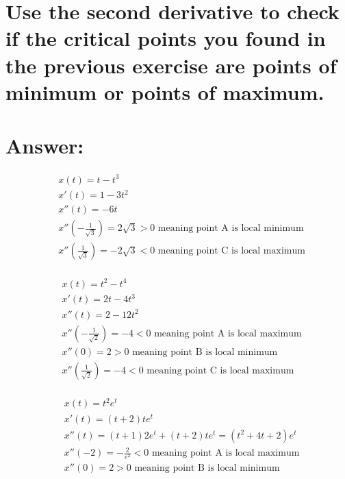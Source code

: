 \documentclass{article}
\begin{document}
\section{\normalfont Use the second derivative to check if the critical points you found in the previous exercise are points of minimum or points of maximum.}

\section*{Answer:}

\begin{equation}
\begin{split}
& x(t) = t - t^3\\
& x'(t) = 1 - 3t^2 \\
& x''(t) = -6t \\
& x''(-\frac{1}{\sqrt{3}}) = 2\sqrt{3} > 0 \text{ meaning point A is local minimum} \\ 
& x''(\frac{1}{\sqrt{3}}) = -2\sqrt{3} < 0 \text{ meaning point C is local maximum} \\
\end{split}
\end{equation}

\begin{equation}
\begin{split}
& x(t) = t^2 - t^4\\
& x'(t) = 2t - 4t^3 \\
& x''(t) = 2 - 12t^2 \\
& x''(-\frac{1}{\sqrt{2}}) = -4 < 0 \text{ meaning point A is local maximum}\\
& x''(0) = 2 > 0 \text{ meaning point B is local minimum} \\
& x''(\frac{1}{\sqrt{2}}) = -4 < 0 \text{ meaning point C is local maximum} \\
\end{split}
\end{equation}

\begin{equation}
\begin{split}
& x(t) = t^2e^t\\
& x'(t) = (t + 2)te^t \\
& x''(t) = (t + 1)2e^t + (t + 2)te^t = (t^2 + 4t + 2)e^t\\
& x''(-2) = -\frac{2}{e^2} < 0 \text{ meaning point A is local maximum}\\
& x''(0) = 2 > 0 \text{ meaning point B is local minimum} \\
\end{split}
\end{equation}
\end{document}
